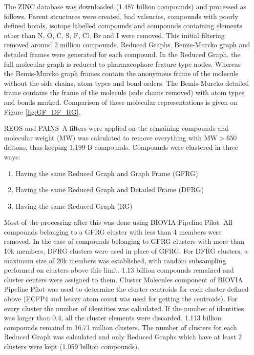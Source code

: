 \documentclass[doublespacing]{bmcart}
\begin{document}
The ZINC database was downloaded (1.487 billion compounds)\cite{ZINC15} and processed as follows. Parent structures were created, bad valencies, compounds with poorly defined bonds, isotope labelled compounds and compounds containing elements other than N, O, C, S, F, Cl, Br and I were removed. This initial filtering removed around 2 million compounds. Reduced Graphs\cite{RedGraph2003,RedGraph2004}, Bemis-Murcko graph and detailed frames\cite{BemisMurcko} were generated for each compound. In the Reduced Graph, the full molecular graph is reduced to pharmacophore feature type nodes. Whereas the Bemis-Murcko graph frames contain the anonymous frame of the molecule without the side chains, atom types and bond orders. The Bemis-Murcko detailed frame contains the frame of the molecule (side chains removed) with atom types and bonds marked. Comparison of these molecular representations is given on Figure \ref{fig:GF_DF_RG}. 



REOS\cite{Walters1998} and PAINS~A\cite{Baell2010} filters were applied on the remaining compounds and molecular weight (MW) was calculated to remove everything with MW$>$650 daltons, thus keeping 1.199 B compounds. Compounds were clustered in three ways:
\begin{enumerate}
\item Having the same Reduced Graph and Graph Frame (GFRG)
\item Having the same Reduced Graph and Detailed Frame (DFRG)
\item  Having the same Reduced Graph (RG)
\end{enumerate}
Most of the processing after this was done using BIOVIA Pipeline Pilot\cite{biovia2020}. All compounds belonging to a GFRG cluster with less than 4 members were removed. In the case of compounds belonging to GFRG clusters with more than 10k members, DFRG clusters were used in place of GFRG. For DFRG clusters, a maximum size of 20k members was established, with random subsampling performed on clusters above this limit. 1.13 billion compounds remained and cluster centers were assigned to them. Cluster Molecules component of BIOVIA Pipeline Pilot\cite{biovia2020} was used to determine the cluster centroids for each cluster defined above (ECFP4 and heavy atom count was used for getting the centroids). For every cluster the number of identities was calculated. If the number of identities was larger than 0.4, all the cluster elements were discarded. 1.113 billion compounds remaind in 16.71 million clusters. The number of clusters for each Reduced Graph was calculated and only Reduced Graphs which have at least 2 clusters were kept (1.059 billion compounds).
\end{document}
